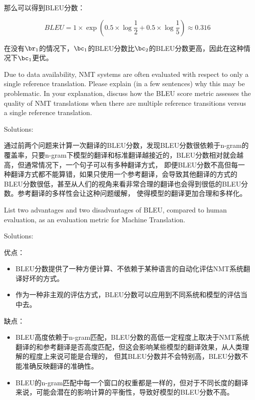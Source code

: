 \begin{parts}
\begin{subparts}
{        那么可以得到BLEU分数：

        $$
            BLEU = 1 \times \exp(0.5 \times \log{\frac{1}{2}} + 0.5 \times \log{\frac{1}{5}}) \approx 0.316
        $$

        在没有$\br_{1}$的情况下，$\bc_{1}$的BLEU分数比$\bc_{2}$的BLEU分数更高，因此在这种情况下$\bc_{1}$更优。
        }
        
        \subpart[2] Due to data availability, NMT systems are often evaluated with respect to only a single reference translation. Please explain (in a few sentences) why this may be problematic. In your explanation, discuss how the BLEU score metric assesses the quality of NMT translations when there are multiple reference transitions versus a single reference translation.
        
        {\color{red}Solutions:
        
        通过前两个问题来计算一次翻译的BLEU分数，发现BLEU分数很依赖于n-gram的覆盖率，只要n-gram下模型的翻译和标准翻译越接近的，BLEU分数相对就会越高，但通常情况下，一个句子可以有多种翻译方式，
        即便BLEU分数不高但每一种翻译方式都不能算错，如果只使用一个参考翻译，会导致其他翻译的方式的BLEU分数很低，甚至从人们的视角来看非常合理的翻译也会得到很低的BLEU分数。参考翻译的多样性会让这种问题缓解，
        使得模型的翻译更加合理和多样化。
        }
        
        \subpart[2] List two advantages and two disadvantages of BLEU, compared to human evaluation, as an evaluation metric for Machine Translation. 
        
        {\color{red}Solutions:
        
        优点：

        \begin{itemize}
            \item BLEU分数提供了一种方便计算、不依赖于某种语言的自动化评估NMT系统翻译好坏的方式。
            \item 作为一种非主观的评估方式，BLEU分数可以应用到不同系统和模型的评估当中去。
        \end{itemize}

        缺点：

        \begin{itemize}
            \item BLEU高度依赖于n-gram匹配，BLEU分数的高低一定程度上取决于NMT系统翻译的和参考翻译是否高度匹配，但这会影响某些模型的翻译效果，从人类理解的程度上来说可能是合理的，
            但其BLEU分数并不会特别高，BLEU分数不能准确反映翻译的准确性。
            \item BLEU的n-gram匹配中每一个窗口的权重都是一样的，但对于不同长度的翻译来说，可能会潜在的影响计算的平衡性，导致好模型的BLEU分数不高。
        \end{itemize}
        }
        

\end{subparts}
\end{parts}

